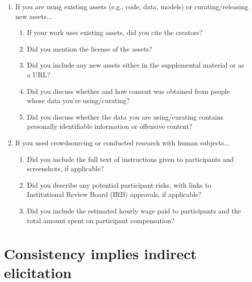 \documentclass[11pt]{article} %
\newcommand{\Comments}{1}
\newcommand{\mytodo}[2]{\ifnum\Comments=1%
	\todo[linecolor=#1!80!black,backgroundcolor=#1,bordercolor=#1!80!black]{#2}\fi}
\newcommand{\jessiet}[1]{\mytodo{purple!20!white}{JF: #1}}
\renewcommand{\L}{\mathcal{L}}
\begin{document}
\begin{enumerate}
	\item If you are using existing assets (e.g., code, data, models) or curating/releasing new assets...
	\begin{enumerate}
		\item If your work uses existing assets, did you cite the creators?
		\answerNA{}
		\item Did you mention the license of the assets?
		\answerNA{}
		\item Did you include any new assets either in the supplemental material or as a URL?
		\answerNA{}
		\item Did you discuss whether and how consent was obtained from people whose data you're using/curating?
		\answerNA{}
		\item Did you discuss whether the data you are using/curating contains personally identifiable information or offensive content?
		\answerNA{}
	\end{enumerate}
	
	\item If you used crowdsourcing or conducted research with human subjects...
	\begin{enumerate}
		\item Did you include the full text of instructions given to participants and screenshots, if applicable?
		\answerNA{}
		\item Did you describe any potential participant risks, with links to Institutional Review Board (IRB) approvals, if applicable?
		\answerNA{}
		\item Did you include the estimated hourly wage paid to participants and the total amount spent on participant compensation?
		\answerNA{}
	\end{enumerate}
	
\end{enumerate}
\newpage
\appendix
\section{Consistency implies indirect elicitation}\label{sec:consis-implies-indir}


\end{document}
